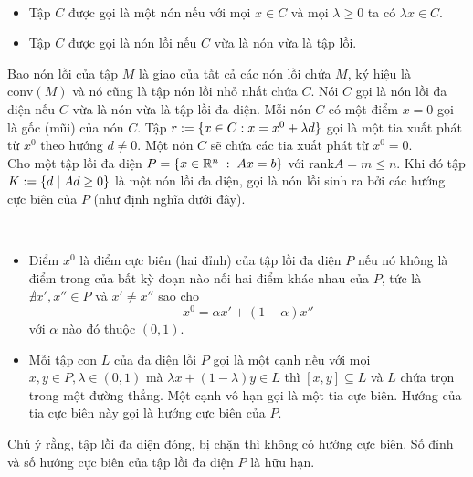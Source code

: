 \begin{definition}\label{de.1.1.2}\
\begin{itemize}
\item Tập $C$ được gọi là một nón nếu với mọi $x\in C$ và mọi $\lambda\geq 0$ ta có $\lambda x\in C$.
\item Tập $C$ được gọi là nón lồi nếu $C$ vừa là nón vừa là tập lồi.
\end{itemize}
\end{definition}
Bao nón lồi của tập $M$ là giao của tất cả các nón lồi chứa $M$, ký hiệu là $\text{conv}(M)$ và nó cũng là tập nón lồi nhỏ nhất chứa $C$. Nói $C$ gọi là nón lồi đa diện nếu $C$ vừa là nón vừa là tập lồi đa diện. Mỗi nón $C$ có một điểm $x=0$ gọi là gốc (mũi) của nón $C$. Tập $r:=\{x\in C: x=x^0+\lambda d\}$ gọi là một tia xuất phát từ $x^0$ theo hướng $d\neq 0$. Một nón $C$ sẽ chứa các tia xuất phát từ $x^0=0$.\\
Cho một tập lồi đa diện $P=\{x\in{\mathbb R}^n\;:\; Ax=b\}$ với $\text{rank} A=m\leq n$. Khi đó tập $K:=\{d\;|\; Ad \geq 0\}$ là một nón lồi đa diện, gọi là nón lồi sinh ra bởi các hướng cực biên của $P$ (như định nghĩa dưới đây). 

\begin{definition}\label{de.1.1.2}\
\begin{itemize}
\item Điểm $x^0$ là điểm cực biên (hai đỉnh) của tập lồi đa diện $P$ nếu nó không là điểm trong của bất kỳ đoạn nào nối hai điểm khác nhau của $P$, tức là $\nexists x', x'' \in P$ và $x' \neq x''$ sao cho 
$$
x^0 = \alpha x'+(1-\alpha)x''
$$
với $\alpha$ nào đó thuộc $(0,1)$.
\item Mỗi tập con $L$ của đa diện lồi $P$ gọi là một cạnh nếu với mọi $x,y\in P, \lambda\in (0,1)$ mà $\lambda x+(1-\lambda)y\in L$ thì $[x,y]\subseteq L$ và $L$ chứa trọn trong một đường thẳng. Một cạnh vô hạn gọi là một tia cực biên. Hướng của tia cực biên này gọi là hướng cực biên của $P$.
\end{itemize}
\end{definition}
Chú ý rằng, tập lồi đa diện đóng, bị chặn thì không có hướng cực biên. Số đỉnh và số hướng cực biên của tập lồi đa diện $P$ là hữu hạn.

